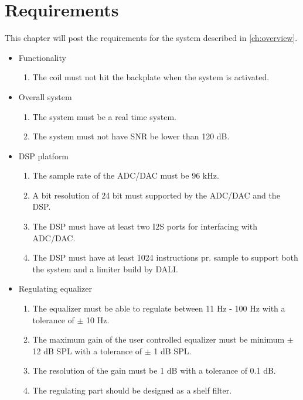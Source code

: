 \chapter{Requirements} \label{ch:requirements}
This chapter will post the requirements for the system described in \autoref{ch:overview}.  

\begin{itemize}
\item Functionality
\begin{enumerate}
\item The coil must not hit the backplate when the system is activated.
\end{enumerate}
\end{itemize}

\begin{itemize}
\item Overall system
\begin{enumerate}
\item The system must be a real time system. 
\item The system must not have SNR be lower than 120 dB.
\end{enumerate}
\end{itemize}

\begin{itemize}
\item DSP platform
\begin{enumerate}
\item The sample rate of the ADC/DAC must be 96 kHz.
\item A bit resolution of 24 bit must supported by the ADC/DAC and the DSP.
\item The DSP must have at least two \gls{I2S} ports for interfacing with ADC/DAC.
\item The DSP must have at least 1024 instructions pr. sample to support both the system and a limiter build by DALI. 
\end{enumerate}
\end{itemize}

\begin{itemize}
\item Regulating equalizer
\begin{enumerate}
\item The equalizer must be able to regulate between 11 Hz - 100 Hz with a tolerance of $\pm$ 10 Hz. 
\item The maximum gain of the user controlled equalizer must be minimum $\pm$ 12 dB SPL with a tolerance of $\pm$ 1 dB SPL.
\item The resolution of the gain must be 1 dB with a tolerance of 0.1 dB.
\item The regulating part should be designed as a shelf filter.
\end{enumerate}
\end{itemize}


